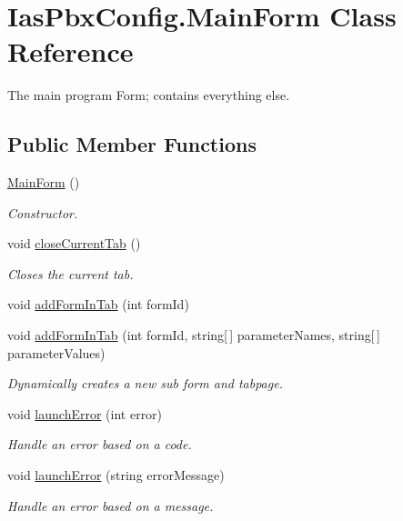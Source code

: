 \hypertarget{class_ias_pbx_config_1_1_main_form}{
\section{IasPbxConfig.MainForm Class Reference}
\label{class_ias_pbx_config_1_1_main_form}
}


The main program Form; contains everything else.  
\subsection*{Public Member Functions}
\begin{DoxyCompactItemize}
\item 
\hyperlink{class_ias_pbx_config_1_1_main_form_a5a90f1985458908bd2aa0e29fbfda5de}{MainForm} ()
\begin{DoxyCompactList}\small\item\em Constructor. \item\end{DoxyCompactList}\item 
void \hyperlink{class_ias_pbx_config_1_1_main_form_a9e37d37f15735de72d7242f27216865b}{closeCurrentTab} ()
\begin{DoxyCompactList}\small\item\em Closes the current tab. \item\end{DoxyCompactList}\item 
void \hyperlink{class_ias_pbx_config_1_1_main_form_a5edd3bec577d04401d92562d507c8380}{addFormInTab} (int formId)
\item 
void \hyperlink{class_ias_pbx_config_1_1_main_form_a1fde9e37db17057ab571cb0c15093fd3}{addFormInTab} (int formId, string\mbox{[}$\,$\mbox{]} parameterNames, string\mbox{[}$\,$\mbox{]} parameterValues)
\begin{DoxyCompactList}\small\item\em Dynamically creates a new sub form and tabpage. \item\end{DoxyCompactList}\item 
void \hyperlink{class_ias_pbx_config_1_1_main_form_a4e7a709ee9db70a8263097fe2541266d}{launchError} (int error)
\begin{DoxyCompactList}\small\item\em Handle an error based on a code. \item\end{DoxyCompactList}\item 
void \hyperlink{class_ias_pbx_config_1_1_main_form_a68cad20fefea28e92a5e51e25bffa2e1}{launchError} (string errorMessage)
\begin{DoxyCompactList}\small\item\em Handle an error based on a message. \item\end{DoxyCompactList}\end{DoxyCompactItemize}
